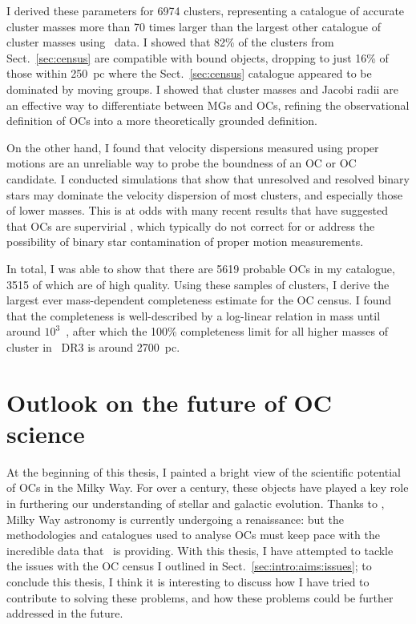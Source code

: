 I derived these parameters for 6974 clusters, representing a catalogue of accurate cluster masses more than 70 times larger than the largest other catalogue of cluster masses using \gaia\ data. I showed that 82\% of the clusters from Sect.~\ref{sec:census} are compatible with bound objects, dropping to just 16\% of those within 250~pc where the Sect.~\ref{sec:census} catalogue appeared to be dominated by moving groups. I showed that cluster masses and Jacobi radii are an effective way to differentiate between MGs and OCs, refining the observational definition of OCs into a more theoretically grounded definition.

On the other hand, I found that velocity dispersions measured using proper motions are an unreliable way to probe the boundness of an OC or OC candidate. I conducted simulations that show that unresolved and resolved binary stars may dominate the velocity dispersion of most clusters, and especially those of lower masses. This is at odds with many recent results that have suggested that OCs are supervirial \citep[e.g.][]{bravi_gaia-eso_2018,kuhn_kinematics_2019,pang_3d_2021}, which typically do not correct for or address the possibility of binary star contamination of proper motion measurements.

In total, I was able to show that there are 5619 probable OCs in my catalogue, 3515 of which are of high quality. Using these samples of clusters, I derive the largest ever mass-dependent completeness estimate for the OC census. I found that the completeness is well-described by a log-linear relation in mass until around $10^3$~\MSun, after which the 100\% completeness limit for all higher masses of cluster in \gaia\ DR3 is around 2700~pc.


\section{Outlook on the future of OC science}

At the beginning of this thesis, I painted a bright view of the scientific potential of OCs in the Milky Way. For over a century, these objects have played a key role in furthering our understanding of stellar and galactic evolution. Thanks to \gaia, Milky Way astronomy is currently undergoing a renaissance: but the methodologies and catalogues used to analyse OCs must keep pace with the incredible data that \gaia\ is providing. With this thesis, I have attempted to tackle the issues with the OC census I outlined in Sect.~\ref{sec:intro:aims:issues}; to conclude this thesis, I think it is interesting to discuss how I have tried to contribute to solving these problems, and how these problems could be further addressed in the future.


